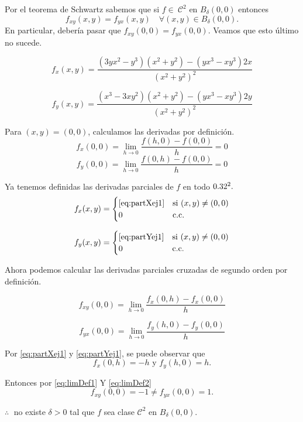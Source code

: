 \begin{solution}
    Por el teorema de Schwartz sabemos que si $f \in\ \mathcal{C}^2$ en  $B_{\delta}(0,0)$
    entonces $$  f_{xy} (x,y) = f_{yx} (x,y) \quad \forall (x,y) \in B_{\delta}(0,0).$$ En particular, deber\'ia pasar que $f_{xy} (0,0) = f_{yx}(0,0).$ Veamos que esto \'ultimo no sucede.

    \begin{equation}
        f_x(x,y) = \frac{(3yx^2-y^3)(x^2+y^2) - (yx^3-xy^3)2x}{(x^2+y^2)^2} \label{eq:partXej1}
    \end{equation}

    \begin{equation}
        f_y(x,y) = \frac{(x^3-3xy^2)(x^2+y^2) - (yx^3-xy^3)2y}{(x^2+y^2)^2}  \label{eq:partYej1}
    \end{equation}

    Para $(x,y) = (0,0)$, calculamos las derivadas por definición.
    \[
        f_x(0,0)  = \lim_{h\to0} \frac{f(h,0) - f(0,0)}{h} = 0
    \]
    \[
        f_y(0,0)  =  \lim_{h\to0} \frac{f(0,h) - f(0,0)}{h} = 0
    \]

    Ya tenemos definidas las derivadas parciales de $f$ en todo $0.32^2.$
    \[
        f_x(x,y) =
        \begin{cases}
            \eqref{eq:partXej1} & \text{si}\ (x,y) \neq (0,0) \\
            0                   & \text{c.c.}
        \end{cases}
    \]

    \[
        f_y(x,y) =
        \begin{cases}
            \eqref{eq:partYej1} & \text{si}\ (x,y) \neq (0,0) \\
            0                   & \text{c.c.}
        \end{cases}
    \]

    Ahora podemos calcular las derivadas parciales cruzadas de segundo orden por definición.

    \begin{equation}
        f_{xy}(0,0) = \lim_{h\to0} \frac{f_x(0,h) - f_x(0,0)}{h} \label{eq:limDef1}
    \end{equation}

    \begin{equation}
        f_{yx}(0,0) = \lim_{h\to0} \frac{f_y(h,0) - f_y(0,0)}{h}  \label{eq:limDef2}
    \end{equation}

    Por \eqref{eq:partXej1} y \eqref{eq:partYej1}, se puede observar que
    \[
        f_x(0,h) = -h \text{ y } f_y(h,0) = h.
    \]

    Entonces por \eqref{eq:limDef1} Y \eqref{eq:limDef2}
    \[
        f_{xy}(0,0) = -1 \neq f_{yx}(0,0) = 1.
    \]

    $\therefore\;$ no existe $\delta>0$ tal que $f$ sea clase $\mathcal{C}^2$ en $B_{\delta}(0,0)$.
\end{solution}


